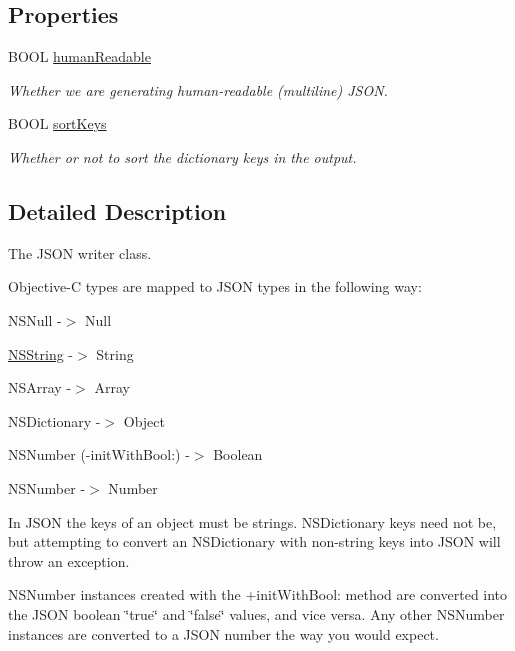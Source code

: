\subsection*{\-Properties}
\begin{DoxyCompactItemize}
\item 
\-B\-O\-O\-L \hyperlink{interface_s_b_json_writer_a16ca84860a2ee76a03b567dc5181a851}{human\-Readable}
\begin{DoxyCompactList}\small\item\em \-Whether we are generating human-\/readable (multiline) \-J\-S\-O\-N. \end{DoxyCompactList}\item 
\-B\-O\-O\-L \hyperlink{interface_s_b_json_writer_af25807a58a322b56cb5d3593532228e5}{sort\-Keys}
\begin{DoxyCompactList}\small\item\em \-Whether or not to sort the dictionary keys in the output. \end{DoxyCompactList}\end{DoxyCompactItemize}


\subsection{\-Detailed \-Description}
\-The \-J\-S\-O\-N writer class. 

\-Objective-\/\-C types are mapped to \-J\-S\-O\-N types in the following way\-:

\begin{DoxyItemize}
\item \-N\-S\-Null -\/$>$ \-Null \item \hyperlink{class_n_s_string}{\-N\-S\-String} -\/$>$ \-String \item \-N\-S\-Array -\/$>$ \-Array \item \-N\-S\-Dictionary -\/$>$ \-Object \item \-N\-S\-Number (-\/init\-With\-Bool\-:) -\/$>$ \-Boolean \item \-N\-S\-Number -\/$>$ \-Number\end{DoxyItemize}
\-In \-J\-S\-O\-N the keys of an object must be strings. \-N\-S\-Dictionary keys need not be, but attempting to convert an \-N\-S\-Dictionary with non-\/string keys into \-J\-S\-O\-N will throw an exception.

\-N\-S\-Number instances created with the +init\-With\-Bool\-: method are converted into the \-J\-S\-O\-N boolean \char`\"{}true\char`\"{} and \char`\"{}false\char`\"{} values, and vice versa. \-Any other \-N\-S\-Number instances are converted to a \-J\-S\-O\-N number the way you would expect. 

